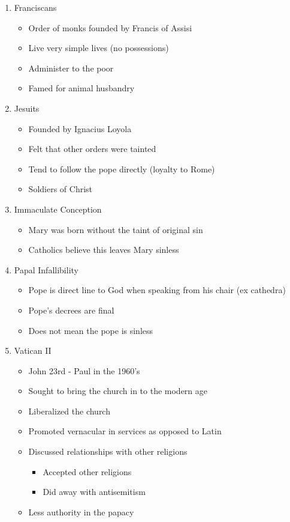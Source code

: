 \documentclass[8pt]{article}
\begin{document}
\begin{enumerate}
\begin{enumerate}
\begin{itemize}
        \end{itemize}
        \item Franciscans
        \begin{itemize}
            \item Order of monks founded by Francis of Assisi
            \item Live very simple lives (no possessions)
            \item Administer to the poor
            \item Famed for animal husbandry
        \end{itemize}
        \item Jesuits
        \begin{itemize}
            \item Founded by Ignacius Loyola
            \item Felt that other orders were tainted
            \item Tend to follow the pope directly (loyalty to Rome)
            \item Soldiers of Christ
        \end{itemize}
        \item Immaculate Conception
        \begin{itemize}
            \item Mary was born without the taint of original sin
            \item Catholics believe this leaves Mary sinless
        \end{itemize}
        \item Papal Infallibility
        \begin{itemize}
            \item Pope is direct line to God when speaking from his chair (ex cathedra)
            \item Pope's decrees are final
            \item Does not mean the pope is sinless
        \end{itemize}
        \item Vatican II
        \begin{itemize}
            \item John 23rd - Paul in the 1960's
            \item Sought to bring the church in to the modern age
            \item Liberalized the church
            \item Promoted vernacular in services as opposed to Latin
            \item Discussed relationships with other religions
            \begin{itemize}
                \item Accepted other religions
                \item Did away with antisemitism
            \end{itemize}
            \item Less authority in the papacy
        \end{itemize}
    \end{enumerate}


\end{enumerate}
\end{document}

